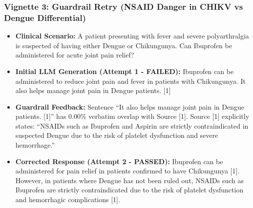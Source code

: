 \documentclass[sn-mathphys,Numbered]{sn-jnl}%
\begin{document}
\subsubsection{Vignette 3: Guardrail Retry (NSAID Danger in CHIKV vs Dengue Differential)}
\begin{itemize}
    \item \textbf{Clinical Scenario:} A patient presenting with fever and severe polyarthralgia is suspected of having either Dengue or Chikungunya. Can Ibuprofen be administered for acute joint pain relief?
    \item \textbf{Initial LLM Generation (Attempt 1 - FAILED):} Ibuprofen can be administered to reduce joint pain and fever in patients with Chikungunya. It also helps manage joint pain in Dengue patients. [1]
    \item \textbf{Guardrail Feedback:} Sentence ``It also helps manage joint pain in Dengue patients. [1]'' has 0.00\% verbatim overlap with Source [1]. Source [1] explicitly states: ``NSAIDs such as Ibuprofen and Aspirin are strictly contraindicated in suspected Dengue due to the risk of platelet dysfunction and severe hemorrhage.''
    \item \textbf{Corrected Response (Attempt 2 - PASSED):} Ibuprofen can be administered for pain relief in patients confirmed to have Chikungunya [1]. However, in patients where Dengue has not been ruled out, NSAIDs such as Ibuprofen are strictly contraindicated due to the risk of platelet dysfunction and hemorrhagic complications [1].
\end{itemize}
\end{document}
